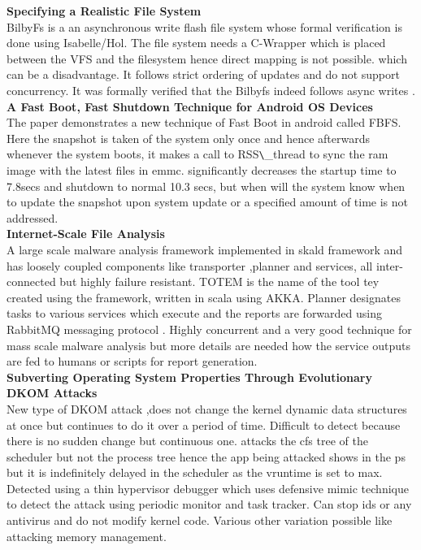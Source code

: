 \textbf{Specifying a Realistic File System }\\
BilbyFs  is a an asynchronous write flash file system whose formal verification is done using Isabelle/Hol. The file system needs a C-Wrapper which is placed between the VFS and the filesystem hence direct mapping is not possible. which can be a disadvantage. It follows strict ordering of updates and do not support concurrency. It was formally verified that the Bilbyfs indeed follows async writes .\\

\textbf{A Fast Boot, Fast Shutdown Technique for Android OS Devices}\\
The paper \cite{yang2016} demonstrates a new technique of Fast Boot in android called FBFS. Here the snapshot is taken of the system only once and hence afterwards whenever the system boots, it makes a call to RSS\verb+\+\_thread to sync the ram image with the latest files in emmc. significantly decreases the startup time to 7.8secs and shutdown to normal 10.3 secs, but when will the system know when to update the snapshot upon system update or a specified amount of time is not addressed.\\

\textbf{Internet-Scale File Analysis}\\
A \cite{hanif2015} large scale malware analysis framework implemented in skald framework and has loosely coupled components like transporter ,planner and services, all inter-connected but highly failure resistant. TOTEM is the name of the tool tey created using the framework, written in scala using AKKA. Planner designates tasks to various services which execute and the reports are forwarded using RabbitMQ messaging protocol . Highly concurrent and a very good technique for mass scale malware analysis but more details are needed how the service outputs are fed to humans or scripts for report generation.\\


\textbf{Subverting Operating System Properties Through Evolutionary DKOM Attacks}\\
 New type\cite{graziano2016} of DKOM attack ,does not change the kernel dynamic data structures at once but continues to do it over a period of time. Difficult to detect because there is no sudden change but continuous one. attacks the cfs tree of the scheduler but not the process tree hence the app being attacked shows in the ps but it is indefinitely delayed in the scheduler as the vruntime is set to max. Detected using a thin hypervisor debugger which uses defensive mimic technique to detect the attack using periodic monitor and task tracker. Can stop ids or any antivirus and do not modify kernel code. Various other variation possible like attacking memory management.\\

